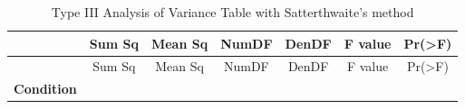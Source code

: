 \documentclass[]{article}
\begin{document}
\begin{longtable}[]{@{}ccccccc@{}}
\caption{Type III Analysis of Variance Table with Satterthwaite's method}\tabularnewline
\toprule
\begin{minipage}[b]{0.22\columnwidth}\centering
~\strut
\end{minipage} & \begin{minipage}[b]{0.09\columnwidth}\centering
Sum Sq\strut
\end{minipage} & \begin{minipage}[b]{0.10\columnwidth}\centering
Mean Sq\strut
\end{minipage} & \begin{minipage}[b]{0.08\columnwidth}\centering
NumDF\strut
\end{minipage} & \begin{minipage}[b]{0.08\columnwidth}\centering
DenDF\strut
\end{minipage} & \begin{minipage}[b]{0.10\columnwidth}\centering
F value\strut
\end{minipage} & \begin{minipage}[b]{0.12\columnwidth}\centering
Pr(\textgreater{}F)\strut
\end{minipage}\tabularnewline
\midrule
\endfirsthead
\toprule
\begin{minipage}[b]{0.22\columnwidth}\centering
~\strut
\end{minipage} & \begin{minipage}[b]{0.09\columnwidth}\centering
Sum Sq\strut
\end{minipage} & \begin{minipage}[b]{0.10\columnwidth}\centering
Mean Sq\strut
\end{minipage} & \begin{minipage}[b]{0.08\columnwidth}\centering
NumDF\strut
\end{minipage} & \begin{minipage}[b]{0.08\columnwidth}\centering
DenDF\strut
\end{minipage} & \begin{minipage}[b]{0.10\columnwidth}\centering
F value\strut
\end{minipage} & \begin{minipage}[b]{0.12\columnwidth}\centering
Pr(\textgreater{}F)\strut
\end{minipage}\tabularnewline
\midrule
\endhead
\begin{minipage}[t]{0.22\columnwidth}\centering
\textbf{Condition}\strut
\end{minipage} & \begin{minipage}[t]{0.09\columnwidth}\centering

\end{minipage}
\end{longtable}
\end{document}
